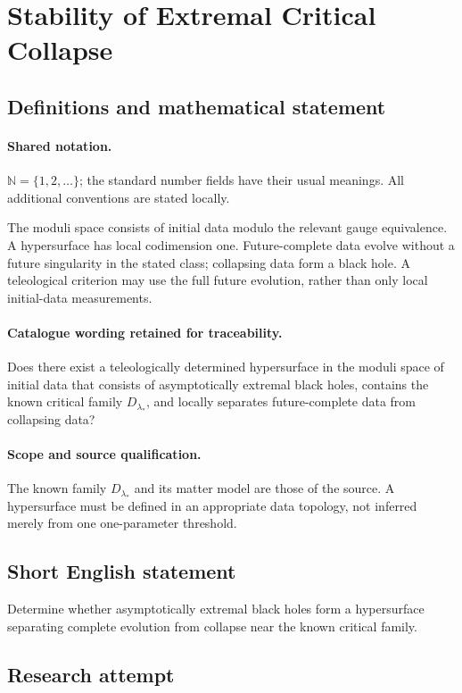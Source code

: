 \documentclass[11pt]{article}
\begin{document}
\section{Stability of Extremal Critical Collapse}\label{statement}

\subsection{Definitions and mathematical statement}

\paragraph{Shared notation.}$\mathbb N=\{1,2,\ldots\}$; the standard number fields have their usual meanings. All additional conventions are stated locally.


The moduli space consists of initial data modulo the relevant gauge equivalence. A hypersurface has local codimension one. Future-complete data evolve without a future singularity in the stated class; collapsing data form a black hole. A teleological criterion may use the full future evolution, rather than only local initial-data measurements.

\paragraph{Catalogue wording retained for traceability.}
Does there exist a teleologically determined hypersurface in the moduli space of initial data that consists of asymptotically extremal black holes, contains the known critical family $D_{\lambda_*}$, and locally separates future-complete data from collapsing data?

\paragraph{Scope and source qualification.}The known family $D_{\lambda_*}$ and its matter model are those of the source. A hypersurface must be defined in an appropriate data topology, not inferred merely from one one-parameter threshold.
\subsection{Short English statement}
Determine whether asymptotically extremal black holes form a hypersurface separating complete evolution from collapse near the known critical family.
\subsection{Research attempt}
\end{document}
